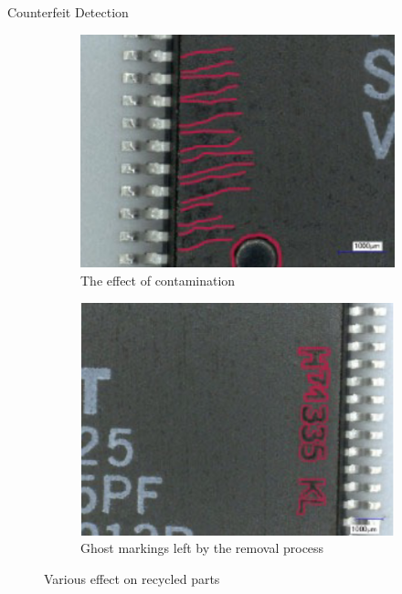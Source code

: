 \begin{section}{Counterfeit Detection}
\begin{figure}[H]
\begin{subfigure}{0.4\textwidth}
      \centering
      \includegraphics[width=\textwidth]{img/hardware/contamination effect.png}
      \caption{The effect of contamination}
      \label{fig:contamination-effect}
    \end{subfigure}
    \begin{subfigure}{0.4\textwidth}
      \centering
      \includegraphics[width=\textwidth]{img/hardware/ghost markings.png}
      \caption{Ghost markings left by the removal process}
      \label{fig:ghost-markings}
    \end{subfigure}
    \caption{Various effect on recycled parts}
  \end{figure}
\end{section}

